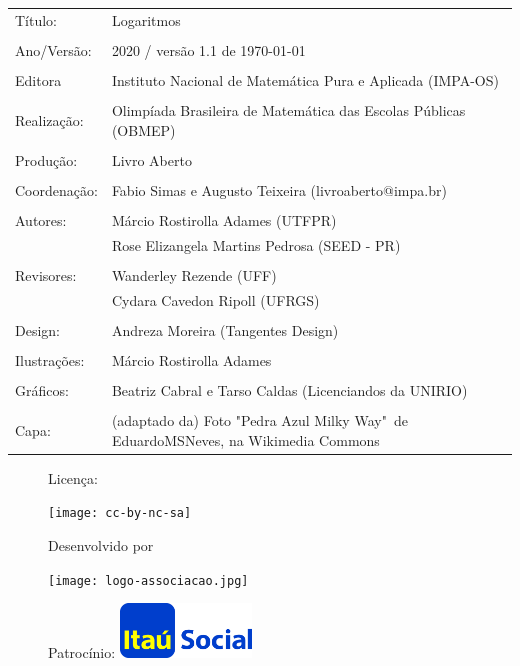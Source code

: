 \begin{tabular}{p{}p{}}
Título: & Logaritmos\\
\\
Ano/Versão: & 2020 / versão 1.1 de \today\\
\\
Editora & Instituto Nacional de Matem\'atica Pura e Aplicada (IMPA-OS)\\
\\
Realização:& Olimp\'iada Brasileira de Matem\'atica das Escolas P\'ublicas (OBMEP)\\
\\
Produção:& Livro Aberto\\
\\
Coordenação:& Fabio Simas e Augusto Teixeira (livroaberto@impa.br)\\
\\
  Autores: & Márcio Rostirolla Adames (UTFPR)\\
             & Rose Elizangela Martins Pedrosa (SEED - PR)\\
\\
Revisores: & Wanderley Rezende (UFF) \\ & Cydara Cavedon Ripoll (UFRGS) \\
                
\\
Design: & Andreza Moreira (Tangentes Design)\\
\\
  Ilustrações: & Márcio Rostirolla Adames \\ 
\\
Gráficos: & Beatriz Cabral e Tarso Caldas (Licenciandos da UNIRIO)\\
\\
Capa: & (adaptado da) Foto "Pedra Azul Milky Way"\, de EduardoMSNeves, na Wikimedia Commons  \\

\end{tabular}
\vspace{.5cm}



\begin{figure}[b]
\begin{minipage}[l]{5cm}
\centering

{\large Licença:}

  \texttt{[image: cc-by-nc-sa]}
\end{minipage}\hfill
\begin{minipage}[c]{5cm}
\centering
{\large Desenvolvido por}

\texttt{[image: logo-associacao.jpg]}
\end{minipage}
\begin{minipage}[r]{5cm}
\centering

{\large Patrocínio:}
  \vspace{1em}
  \includegraphics[width=3.5cm]{itau}
\end{minipage}
\end{figure}

